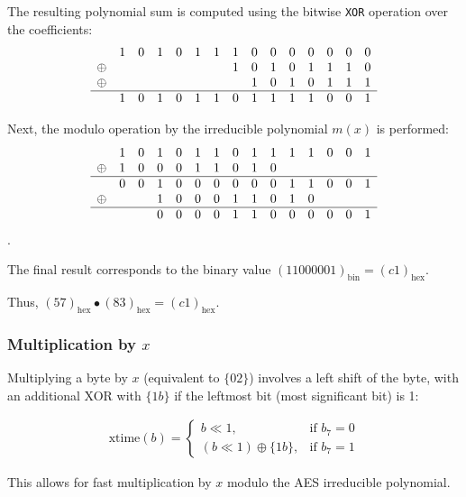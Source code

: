 The resulting polynomial sum is computed using the bitwise \texttt{XOR} operation over the coefficients:
\[
\begin{array}{ccccccccccccccc}
    &1&0&1&0&1&1&1&0&0&0&0&0&0&0\\
    \oplus &&&&&&&1&0&1&0&1&1&1&0\\
    \oplus &&&&&&&&1&0&1&0&1&1&1\\
    \hline
    &1&0&1&0&1&1&0&1&1&1&1&0&0&1
\end{array}
\]

Next, the modulo operation by the irreducible polynomial $m(x)$ is performed:
\[
\begin{array}{cccccccccccccccc}
    &1&0&1&0&1&1&0&1&1&1&1&0&0&1\\
    \oplus &1&0&0&0&1&1&0&1&0\\
    \hline
    &0&0&1&0&0&0&0&0&0&1&1&0&0&1\\
    \oplus &&&1&0&0&0&1&1&0&1&0\\
    \hline
    &&&0&0&0&0&1&1&0&0&0&0&0&1
\end{array}
\].

The final result corresponds to the binary value $(11000001)_{\text{bin}} = (c1)_{\text{hex}}$.

Thus, $(57)_{\text{hex}} \bullet (83)_{\text{hex}} = (c1)_{\text{hex}}$.



\subsubsection{Multiplication by \texorpdfstring{$x$}{x}}
\label{sec:multx}

Multiplying a byte by $x$ (equivalent to $\{02\}$) involves a left shift of the byte, with an additional XOR with $\{1b\}$ if the leftmost bit (most significant bit) is 1:

\begin{align}
    \text{xtime}(b) =
    \begin{cases}
    b \ll 1, & \text{if } b_7 = 0 \\
    (b \ll 1) \oplus \{1b\}, & \text{if } b_7 = 1
    \end{cases}
\end{align}

This allows for fast multiplication by $x$ modulo the \Gls{AES} irreducible polynomial.
